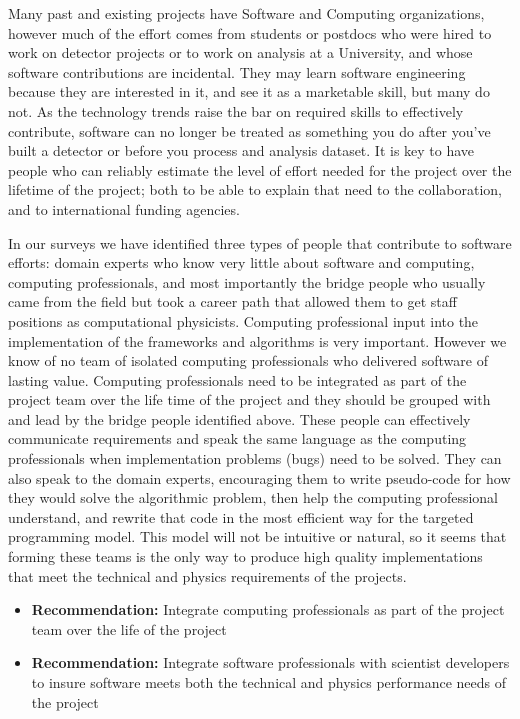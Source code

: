 Many past and existing projects have Software and
Computing organizations, however much of the effort comes from
students or postdocs who were hired to work on detector
projects or to work on analysis at a University, and whose software
contributions are incidental. They may learn
software engineering because they are interested in it, and see it
as a marketable skill, but many do not.  As the technology trends
raise the bar on required skills to effectively contribute, software
can no longer be treated as something you do after you've built a
detector or before you process and analysis dataset. 
It is key to have people who can reliably estimate the level
of effort needed for the project over the lifetime of the
project; both to be able to explain that need to the collaboration,
and to international funding agencies.

In our surveys we have identified three types of people that
contribute to software efforts: domain experts who know very little
about software and computing, computing professionals, and most
importantly the bridge people who usually came from the field but
took a career path that allowed them to get staff positions as
computational physicists. Computing professional input into the
implementation of the frameworks and algorithms is very important.
However we know of no team of isolated computing professionals who
delivered software of lasting value.  Computing professionals need
to be integrated as part of the project team over the life
time of the project and they should be grouped with and lead by
the bridge people identified above. These people can effectively
communicate requirements and speak the same language as the computing
professionals when implementation problems (bugs) need to be solved.
They can also speak to the domain experts, encouraging them to write
pseudo-code for how they would solve the algorithmic problem, then
help the computing professional understand, and rewrite that code
in the most efficient way for the targeted programming model.  This
model will not be intuitive or natural, so it seems that forming
these teams is the only way to produce high quality implementations
that meet the technical and physics requirements of the
projects.

\begin{itemize}
\item[] {\bf Recommendation:} Integrate computing professionals as part of the project team over the life of the project
\item[] {\bf Recommendation:} Integrate software professionals with scientist developers to insure software meets both the technical and physics performance needs of the project
\end{itemize}

